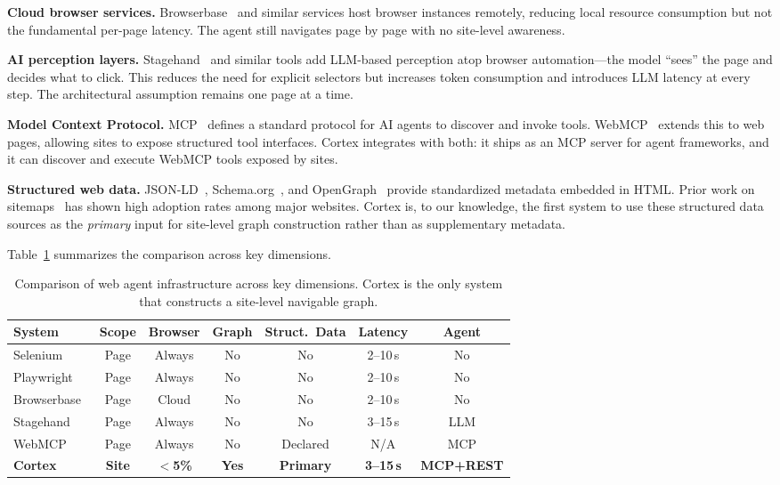 \documentclass[10pt, twocolumn]{article}
\begin{document}
\textbf{Cloud browser services.} Browserbase~\cite{browserbase2024} and similar services host browser instances remotely, reducing local resource consumption but not the fundamental per-page latency. The agent still navigates page by page with no site-level awareness.

\textbf{AI perception layers.} Stagehand~\cite{stagehand2024} and similar tools add LLM-based perception atop browser automation---the model ``sees'' the page and decides what to click. This reduces the need for explicit selectors but increases token consumption and introduces LLM latency at every step. The architectural assumption remains one page at a time.

\textbf{Model Context Protocol.} MCP~\cite{mcp2024} defines a standard protocol for AI agents to discover and invoke tools. WebMCP~\cite{webmcp2025} extends this to web pages, allowing sites to expose structured tool interfaces. Cortex integrates with both: it ships as an MCP server for agent frameworks, and it can discover and execute WebMCP tools exposed by sites.

\textbf{Structured web data.} JSON-LD~\cite{jsonld2014}, Schema.org~\cite{schemaorg2011}, and OpenGraph~\cite{opengraph2010} provide standardized metadata embedded in HTML. Prior work on sitemaps~\cite{schonberger2023sitemaps} has shown high adoption rates among major websites. Cortex is, to our knowledge, the first system to use these structured data sources as the \emph{primary} input for site-level graph construction rather than as supplementary metadata.

Table~\ref{tab:related} summarizes the comparison across key dimensions.

\begin{table}[t]
\caption{Comparison of web agent infrastructure across key dimensions. Cortex is the only system that constructs a site-level navigable graph.}
\label{tab:related}
\centering
\small
\scriptsize
\begin{tabular}{@{}lcccccc@{}}
\toprule
\textbf{System} & \textbf{Scope} & \textbf{Browser} & \textbf{Graph} & \textbf{Struct.\ Data} & \textbf{Latency} & \textbf{Agent} \\
\midrule
Selenium~\cite{selenium2004} & Page & Always & No & No & 2--10\,s & No \\
Playwright~\cite{playwright2020} & Page & Always & No & No & 2--10\,s & No \\
Browserbase~\cite{browserbase2024} & Page & Cloud & No & No & 2--10\,s & No \\
Stagehand~\cite{stagehand2024} & Page & Always & No & No & 3--15\,s & LLM \\
WebMCP~\cite{webmcp2025} & Page & Always & No & Declared & N/A & MCP \\
\midrule
\textbf{Cortex} & \textbf{Site} & \textbf{$<$5\%} & \textbf{Yes} & \textbf{Primary} & \textbf{3--15\,s} & \textbf{MCP+REST} \\
\bottomrule
\end{tabular}
\end{table}
\end{document}
